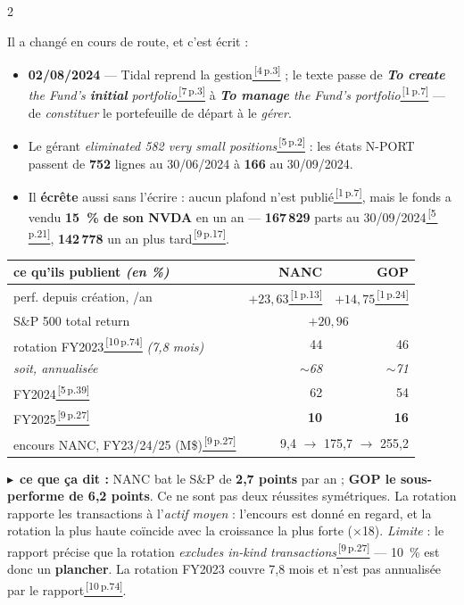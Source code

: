 \documentclass[9pt,a4paper]{extarticle}
\newcommand{\et}[2]{\vspace{1.6mm}{\color{bleu}\bfseries #1 $\cdot$ #2}\par\vspace{0.2mm}}
\newcommand{\lire}[1]{{\scriptsize\color{vert}$\blacktriangleright$~\textbf{ce que ça dit :} #1}\par}
\newenvironment{pts}{\begin{itemize}[leftmargin=3.4mm,itemsep=0.2mm,topsep=0.4mm,parsep=0pt,label={\color{bleu}\footnotesize\textbullet}]}{\end{itemize}}
\newcommand{\rf}[3]{\href{docs_nanc_gop/#2\#page=#3}{\color{bleu}\textsuperscript{\,[#1\,p.#3]}}}
\newcommand{\sPro}[1]{\rf{1}{1-prospectus-statutaire-SAI-20260127.pdf}{#1}}
\newcommand{\sOri}[1]{\rf{7}{7-prospectus-origine-20230203.pdf}{#1}}
\newcommand{\sChg}[1]{\rf{4}{4-changement-methode-20240802.pdf}{#1}}
\newcommand{\sAtrois}[1]{\rf{10}{10-rapport-annuel-FY2023.pdf}{#1}}
\newcommand{\sAquatre}[1]{\rf{5}{5-rapport-annuel-FY2024.pdf}{#1}}
\newcommand{\sAcinq}[1]{\rf{9}{9-rapport-annuel-FY2025.pdf}{#1}}
\begin{document}
\begin{multicols}{2}
\et{b}{Le changement de mécanique}
Il a changé en cours de route, et c'est écrit :
\begin{pts}
\item \textbf{02/08/2024} --- Tidal reprend la gestion\sChg{3} ; le texte passe de \og{}\emph{\textbf{To create} the Fund's \textbf{initial} portfolio}\fg{}\sOri{3} à \og{}\emph{\textbf{To manage} the Fund's portfolio}\fg{}\sPro{7} --- de \emph{constituer} le portefeuille de départ à le \emph{gérer}.
\item Le gérant \og{}\emph{eliminated 582 very small positions}\fg{}\sAquatre{2} : les états N-PORT passent de \textbf{752} lignes au 30/06/2024 à \textbf{166} au 30/09/2024.
\item Il \textbf{écrête} aussi sans l'écrire : aucun plafond n'est publié\sPro{7}, mais le fonds a vendu \textbf{15~\% de son NVDA} en un an --- \textbf{167\,829} parts au 30/09/2024\sAquatre{21}, \textbf{142\,778} un an plus tard\sAcinq{17}.
\end{pts}
\begin{center}\scriptsize
\begin{tabular}{@{}l r r@{}}
\toprule
ce qu'ils publient \emph{\scriptsize(en \%)} & NANC & GOP \\
\midrule
perf. depuis création, /an & $+23{,}63$\sPro{13} & $+14{,}75$\sPro{24} \\
S\&P 500 total return & \multicolumn{2}{c}{$+20{,}96$} \\
\midrule
rotation FY2023\sAtrois{74} \emph{(7,8 mois)} & 44 & 46 \\
\quad \emph{soit, annualisée} & \emph{$\sim$68} & \emph{$\sim$71} \\
\quad FY2024\sAquatre{39} & 62 & 54 \\
\quad FY2025\sAcinq{27} & \textbf{10} & \textbf{16} \\
\midrule
encours NANC, FY23/24/25 (M\$)\sAcinq{27} & \multicolumn{2}{r}{9,4 $\to$ 175,7 $\to$ 255,2} \\
\bottomrule
\end{tabular}
\end{center}
\lire{NANC bat le S\&P de \textbf{2,7 points} par an ; \textbf{GOP le sous-performe de 6,2 points}. Ce ne sont pas deux réussites symétriques. La rotation rapporte les transactions à l'\emph{actif moyen} : l'encours est donné en regard, et la rotation la plus haute coïncide avec la croissance la plus forte ($\times$18). \emph{Limite} : le rapport précise que la rotation \og{}\emph{excludes in-kind transactions}\fg{}\sAcinq{27} --- 10~\% est donc un \textbf{plancher}. La rotation FY2023 couvre 7,8 mois et n'est pas annualisée par le rapport\sAtrois{74}.}


\end{multicols}
\end{document}
